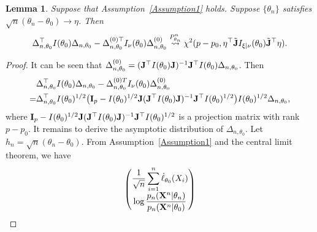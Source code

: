 \documentclass[11pt]{article}
\theoremstyle{plain}
\newtheorem{lemma}{\quad\quad Lemma}
\theoremstyle{definition}
\theoremstyle{remark}
\begin{document}
\begin{appendices}
    \begin{lemma}
        Suppose that Assumption~\ref{Assumption1} holds.
        Suppose $\{\theta_n\}$ satisfies $\sqrt{n}(\theta_n-\theta_0)\to \eta$.
        Then
        \begin{align*}
        \Delta_{n,\theta_0}^\top  I(\theta_0)\Delta_{n,\theta_0}
            -
            \Delta_{n,\theta_0}^{{(0)}\top} I_{\nu}(\theta_0)\Delta^{(0)}_{n,\theta_0}
\overset{P^n_{\theta_n}}{\rightsquigarrow}
    \chi^2 (p-p_0, \eta^\top\tilde {\mathbf{J}} I_{\xi|\nu}(\theta_0) \tilde{\mathbf{J}}^\top\eta )
.
        \end{align*}
        \label{lemma:score}
    \end{lemma}
    \begin{proof}
        It can be seen that $\Delta_{n,\theta_0}^{(0)}=(\mathbf{J}^\top  I(\theta_0)\mathbf{J})^{-1} \mathbf{J}^\top  I(\theta_0) \Delta_{n,\theta_0}$.
Then
\begin{equation*}
    \begin{split}
        &
        \Delta_{n,\theta_0}^\top  I(\theta_0) \Delta_{n,\theta_0}
    -
    \Delta_{n,\theta_0}^{{(0)}T} I_{\nu}(\theta_0) \Delta^{(0)}_{n,\theta_0}
            \\
            =&
            \Delta_{n,\theta_0}^\top  I(\theta_0)^{1/2}\big(
            \mathbf{I}_p-
            I(\theta_0)^{1/2} \mathbf{J} (\mathbf{J}^\top  I(\theta_0) \mathbf{J})^{-1} \mathbf{J}^\top  I(\theta_0)^{1/2}
        \big)I(\theta_0)^{1/2}\Delta_{n,\theta_0},
    \end{split}
\end{equation*}
where $
            \mathbf{I}_p-
            I(\theta_0)^{1/2} \mathbf{J} (\mathbf{J}^\top  I(\theta_0) \mathbf{J})^{-1} \mathbf{J}^\top  I(\theta_0)^{1/2}
$
is a projection matrix with rank $p-p_0$.
It remains to derive the asymptotic distribution of $\Delta_{n,\theta_0}$.
Let $h_n=\sqrt{n}(\theta_n-\theta_0)$.
     From Assumption~\ref{Assumption1} and the central limit theorem, we have
\begin{equation*}
    \begin{split}
    \left(
    \begin{matrix}
        \displaystyle
        \frac{1}{\sqrt{n}}\sum^n_{i=1}\dot{\ell}_{\theta_0}(X_i)
        \\
        \displaystyle
        \log \frac{p_n(\BX^{n}|\theta_n)}{p_n(\BX^{n}|\theta_0)}
    \end{matrix}
    \right)

\end{split}
\end{equation*}
\end{proof}
\end{appendices}
\end{document}

